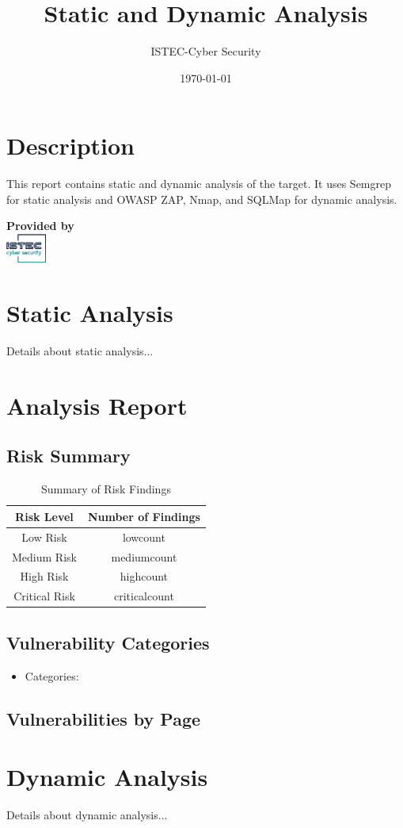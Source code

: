 \documentclass[12pt]{article}
\title{\textbf{Static and Dynamic Analysis}}
\author{ISTEC-Cyber Security}
\date{\today}  %
\begin{document}
\maketitle

\section*{Description}
This report contains static and dynamic analysis of the target. It uses Semgrep for static analysis and OWASP ZAP, Nmap, and SQLMap for dynamic analysis.

\vspace{10cm} %

\begin{center}
	\textbf{Provided by} \\[1em]
	\includegraphics[width=0.1\textwidth]{logo75.png}
\end{center}

\newpage  %

\section{Static Analysis}
Details about static analysis...

\section{Analysis Report}

\subsection{Risk Summary}
\begin{table}[h!]
    \centering
    \renewcommand{\arraystretch}{1.5}
    \begin{tabular}{|c|c|}
        \hline
        \textbf{Risk Level} & \textbf{Number of Findings} \\
        \hline
        Low Risk & lowcount \\ 
        \hline
        Medium Risk & mediumcount \\ 
        \hline
        High Risk & highcount \\ 
        \hline
        Critical Risk & criticalcount \\ 
        \hline
    \end{tabular}
    \caption{Summary of Risk Findings}
    \label{tab:risk_summary}

\subsection{Vulnerability Categories}
    \begin{itemize}
	\item Categories:
    \end{itemize}
\end{table}

\subsection{Vulnerabilities by Page}
\newpage
\section{Dynamic Analysis}
Details about dynamic analysis...
\end{document}

